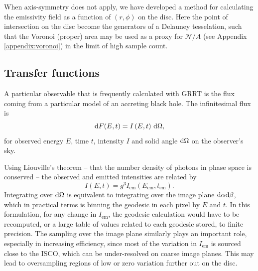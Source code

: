 When axis-symmetry does not apply, we have developed a method for calculating the emissivity field as a function of $(r, \phi)$ on the disc. Here the point of intersection on the disc become the generators of a Delauney tesselation, such that the Voronoi (proper) area may be used as a proxy for $\mathcal{N} / A$ (see Appendix \ref{appendix:voronoi}) in the limit of high sample count.

\subsection{Transfer functions}

A particular observable that is frequently calculated with GRRT is the flux coming from a particular model of an accreting black hole. The infinitesimal flux is
\begin{equation}
\text{d} F(E, t) = I\left(E, t\right)\, \text{d} \Omega,
\end{equation}
for observed energy $E$, time $t$, intensity $I$ and solid angle $\text{d} \Omega$ on the observer's sky.

Using Liouville's theorem -- that the number density of photons in phase space is conserved -- the observed and emitted intensities are related by
\begin{equation}
    I\left( E, t \right) = g^3 I_\text{em}\left(E_\text{em}, t_\text{em}\right).
\end{equation}
Integrating over $\text{d} \Omega$ is equivalent to integrating over the image plane $\text{d} \alpha \text{d} \beta$, which in practical terms is binning the geodesic in each pixel by $E$ and $t$. In this formulation, for any change in $I_\text{em}$, the geodesic calculation would have to be recomputed, or a large table of values related to each geodesic stored, to finite precision. The sampling over the image plane similarly plays an important role, especially in increasing efficiency, since most of the variation in $I_\text{em}$ is sourced close to the ISCO, which can be under-resolved on coarse image planes. This may lead to oversampling regions of low or zero variation further out on the disc.

\begin{figure}
    \centering
    \caption{}
    \label{fig:transfer-parameterisation}
\end{figure}

